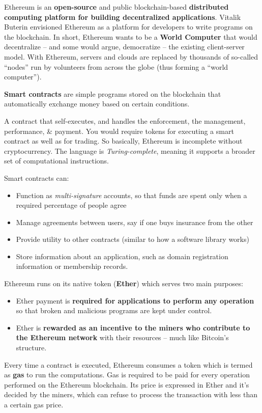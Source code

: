 Ethereum is an \textbf{open-source} and public blockchain-based \textbf{distributed computing platform for building decentralized applications}. Vitalik Buterin envisioned Ethereum as a platform for developers to write programs on the blockchain. In short, Ethereum wants to be a \textbf{World Computer} that would decentralize -- and some would argue, democratize -- the existing client-server model. With Ethereum, servers and clouds are replaced by thousands of so-called ``nodes'' run by volunteers from across the globe (thus forming a ``world computer'').

\textbf{Smart contracts} are simple programs stored on the blockchain that automatically exchange money based on certain conditions.

A contract that self-executes, and handles the enforcement, the management, performance, \& payment. You would require tokens for executing a smart contract as well as for trading. So basically, Ethereum is incomplete without cryptocurrency. The language is \textit{Turing-complete}, meaning it supports a broader set of computational instructions.

Smart contracts can:
\begin{itemize}
    \item Function as \textit{multi-signature} accounts, so that funds are spent only when a required percentage of people agree
    \item Manage agreements between users, say if one buys insurance from the other
    \item Provide utility to other contracts (similar to how a software library works)
    \item Store information about an application, such as domain registration information or membership records.
\end{itemize}

Ethereum runs on its native token (\textbf{Ether}) which serves two main purposes:
\begin{itemize}
    \item Ether payment is \textbf{required for applications to perform any operation} so that broken and malicious programs are kept under control.
    \item Ether is \textbf{rewarded as an incentive to the miners who contribute to the Ethereum network} with their resources -- much like Bitcoin's structure.
\end{itemize}

Every time a contract is executed, Ethereum consumes a token which is termed as \textbf{gas} to run the computations. Gas is required to be paid for every operation performed on the Ethereum blockchain. Its price is expressed in Ether and it's decided by the miners, which can refuse to process the transaction with less than a certain gas price.

